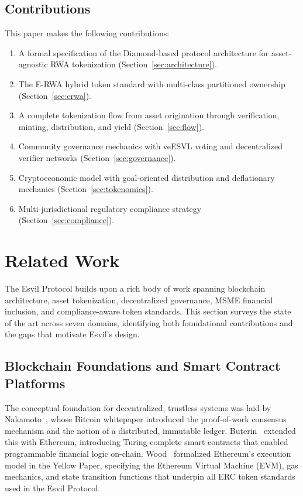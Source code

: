\documentclass[11pt,a4paper]{article}
\begin{document}
\subsection{Contributions}

This paper makes the following contributions:

\begin{enumerate}[nosep]
    \item A formal specification of the Diamond-based protocol architecture for asset-agnostic RWA tokenization (Section~\ref{sec:architecture}).
    \item The E-RWA hybrid token standard with multi-class partitioned ownership (Section~\ref{sec:erwa}).
    \item A complete tokenization flow from asset origination through verification, minting, distribution, and yield (Section~\ref{sec:flow}).
    \item Community governance mechanics with veESVL voting and decentralized verifier networks (Section~\ref{sec:governance}).
    \item Cryptoeconomic model with goal-oriented distribution and deflationary mechanics (Section~\ref{sec:tokenomics}).
    \item Multi-jurisdictional regulatory compliance strategy (Section~\ref{sec:compliance}).
\end{enumerate}

\section{Related Work}
\label{sec:related}

The Esvil Protocol builds upon a rich body of work spanning blockchain architecture, asset tokenization, decentralized governance, MSME financial inclusion, and compliance-aware token standards. This section surveys the state of the art across seven domains, identifying both foundational contributions and the gaps that motivate Esvil's design.

\subsection{Blockchain Foundations and Smart Contract Platforms}

The conceptual foundation for decentralized, trustless systems was laid by Nakamoto~\cite{nakamoto2008}, whose Bitcoin whitepaper introduced the proof-of-work consensus mechanism and the notion of a distributed, immutable ledger. Buterin~\cite{buterin2014} extended this with Ethereum, introducing Turing-complete smart contracts that enabled programmable financial logic on-chain. Wood~\cite{wood2014} formalized Ethereum's execution model in the Yellow Paper, specifying the Ethereum Virtual Machine (EVM), gas mechanics, and state transition functions that underpin all ERC token standards used in the Esvil Protocol.
\end{document}
